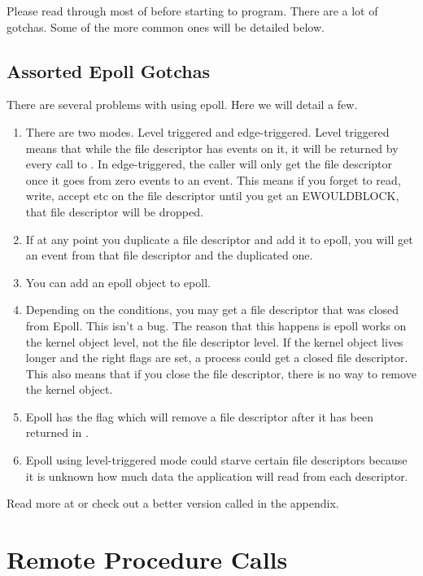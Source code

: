 Please read through most of  before starting to program.
There are a lot of gotchas.
Some of the more common ones will be detailed below.

\subsection{Assorted Epoll Gotchas}

There are several problems with using epoll. Here we will detail a few.

\begin{enumerate}
\item There are two modes. Level triggered and edge-triggered. Level triggered means that while the file descriptor has events on it, it will be returned by every call to . In edge-triggered, the caller will only get the file descriptor once it goes from zero events to an event.
  This means if you forget to read, write, accept etc on the file descriptor until you get an EWOULDBLOCK, that file descriptor will be dropped.
\item If at any point you duplicate a file descriptor and add it to epoll, you will get an event from that file descriptor and the duplicated one.
\item You can add an epoll object to epoll.
\item Depending on the conditions, you may get a file descriptor that was closed from Epoll. This isn't a bug. The reason that this happens is epoll works on the kernel object level, not the file descriptor level.
  If the kernel object lives longer and the right flags are set, a process could get a closed file descriptor.
  This also means that if you close the file descriptor, there is no way to remove the kernel object.
\item Epoll has the  flag which will remove a file descriptor after it has been returned in .
\item Epoll using level-triggered mode could starve certain file descriptors because it is unknown how much data the application will read from each descriptor.
\end{enumerate}

Read more at  or check out a better version called  in the appendix.

\section{Remote Procedure Calls}

